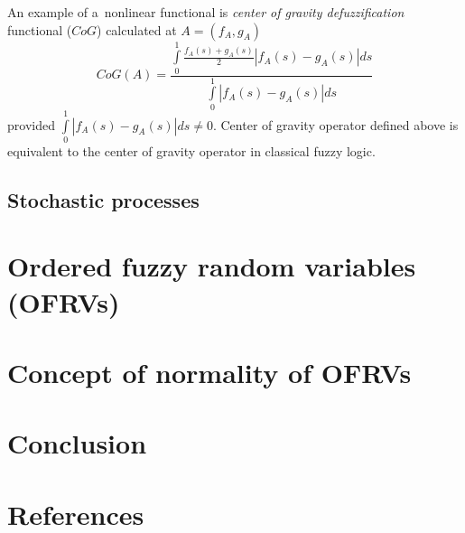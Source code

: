 \documentclass[review]{elsarticle}
\begin{document}
An example of a~nonlinear functional is {\em center of gravity defuzzification} functional ($CoG$) calculated at $A=(f_A,g_A)$
\begin{equation}
\label{eq:cog}
CoG(A)=\frac{\int\limits_0^1\frac{f_A(s)+g_A(s)}{2}|f_A(s)-g_A(s)|ds}{\int\limits_0^1|f_A(s)-g_A(s)|ds}
\end{equation}
provided $\int\limits_0^1|f_A(s)-g_A(s)|ds\neq0$. Center of gravity operator defined above is equivalent to the center of gravity operator in classical fuzzy logic.

\subsection{Stochastic processes}


\section{Ordered fuzzy random variables (OFRVs)}

\section{Concept of normality of OFRVs}

\section{Conclusion}

\section*{References}


\end{document}
